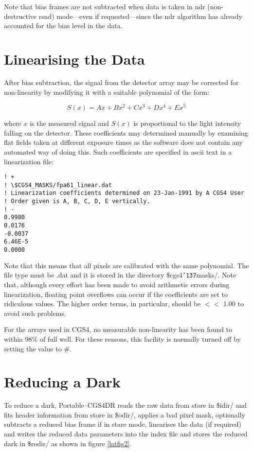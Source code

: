 \documentclass[a4paper]{book}
\renewcommand{\_}{{\tt\char'137}}
\begin{document}
Note that {\sc bias} frames are not subtracted when data is taken in {\sc
ndr} (non-destructive read) mode---even if requested---since the {\sc ndr}
algorithm has already accounted for the bias level in the data. 

\section{Linearising the Data}
After {\sc bias} subtraction, the signal from the detector array may be
corrected for non-linearity by modifying it with a suitable polynomial of
the form: 

\begin{equation}
  S(x) = Ax + Bx^{2} + Cx^{3} + Dx^{4} + Ex^{5} \label{equation_1}
\end{equation}

where $x$ is the measured signal and $S(x)$ is proportional to the light
intensity falling on the detector. These coefficients may determined
manually by examining {\sc flat} fields taken at different exposure times
as the software does not contain any automated way of doing this. Such
coefficients are specified in {\sc ascii} text in a linearization file: 

\begin{verbatim}
! +
! \$CGS4_MASKS/fpa61_linear.dat
! Linearization coefficients determined on 23-Jan-1991 by A CGS4 User
! Order given is A, B, C, D, E vertically.
! -
0.9980
0.0176
-0.0037
6.46E-5
0.0000
\end{verbatim}

Note that this means that all pixels are calibrated with the same
polynomial. The file type must be .dat and it is stored in the directory
{\sc \$cgs4\_masks/}. Note that, although every effort has been made to
avoid arithmetic errors during linearization, floating point overflows can
occur if the coefficients are set to ridiculous values. The higher order
terms, in particular, should be $<<$ 1.00 to avoid such problems. 

For the arrays used in CGS4, no measurable non-linearity has been found to
within 98\% of full well. For these reasons, this facility is normally
turned off by setting the value to \#. 

\section{Reducing a Dark}
To reduce a {\sc dark}, Portable--CGS4DR reads the raw data from store in
{\sc \$idir}/ and {\sc fits} header information from store in {\sc
\$odir/}, applies a bad pixel mask, optionally subtracts a reduced {\sc
bias} frame if in stare mode, linearises the data (if required) and writes
the reduced data parameters into the index file and stores the reduced
{\sc dark} in {\sc \$rodir/} as shown in figure \ref{latfig2}.
\end{document}
